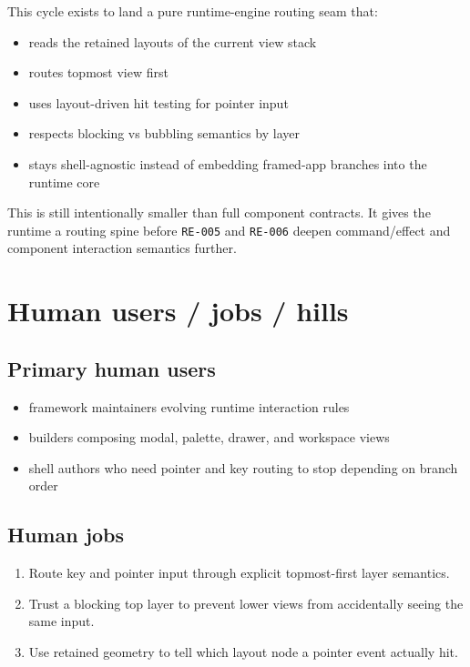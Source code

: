 This cycle exists to land a pure runtime-engine routing seam that:

\begin{itemize}
\tightlist
\item
  reads the retained layouts of the current view stack
\item
  routes topmost view first
\item
  uses layout-driven hit testing for pointer input
\item
  respects blocking vs bubbling semantics by layer
\item
  stays shell-agnostic instead of embedding framed-app branches into the runtime core
\end{itemize}

This is still intentionally smaller than full component contracts. It gives the runtime a routing spine before \texttt{R\allowbreak{}E\allowbreak{}-\allowbreak{}0\allowbreak{}0\allowbreak{}5} and \texttt{R\allowbreak{}E\allowbreak{}-\allowbreak{}0\allowbreak{}0\allowbreak{}6} deepen command/effect and component interaction semantics further.

\section{Human users / jobs / hills}\label{record-152-human-users-jobs-hills}

\subsection{Primary human users}\label{record-152-primary-human-users}

\begin{itemize}
\tightlist
\item
  framework maintainers evolving runtime interaction rules
\item
  builders composing modal, palette, drawer, and workspace views
\item
  shell authors who need pointer and key routing to stop depending on branch order
\end{itemize}

\subsection{Human jobs}\label{record-152-human-jobs}

\begin{enumerate}
\def\labelenumi{\arabic{enumi}.}
\tightlist
\item
  Route key and pointer input through explicit topmost-first layer semantics.
\item
  Trust a blocking top layer to prevent lower views from accidentally seeing the same input.
\item
  Use retained geometry to tell which layout node a pointer event actually hit.
\end{enumerate}

